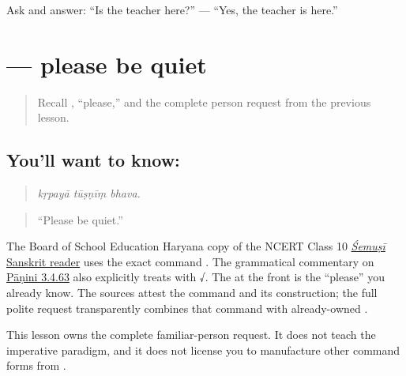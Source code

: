 \begin{tcolorbox}[breakable,colback=teal!4,colframe=teal!35!black,title={Before you move on}]
Ask and answer: “Is the teacher here?” — “Yes, the teacher is here.”
\end{tcolorbox}
\section[\texorpdfstring{\sk{कृपया} \sk{तूष्णीं} \sk{भव} (kṛpayā tūṣṇīṃ bhava)}{कृपया तूष्णीं भव (kṛpayā tūṣṇīṃ bhava)}]{   — please be quiet}

\label{lesson:SA-C271-request-quiet}



\begin{quote}
Recall \textbf{}, “please,” and the complete person request from the previous lesson.
\end{quote}

\subsection*{You'll want to know:   }
\begin{quote}
\textbf{  }
\end{quote}

\begin{quote}
\emph{kṛpayā tūṣṇīṃ bhava.}
\end{quote}

\begin{quote}
“Please be quiet.”
\end{quote}

The Board of School Education Haryana copy of the NCERT Class 10 \href{https://bseh.org.in/uploads/ebooks/20\_Class\_10th\_Shemushi\_Sansktit\_120pp.pdf}{\emph{Śemuṣī} Sanskrit reader} uses the exact command \textbf{ }. The grammatical commentary on \href{https://sanskritdocuments.org/learning\_tools/ashtadhyayi/vyakhya/3/3.4.63.htm}{Pāṇini 3.4.63} also explicitly treats \textbf{} with √. The \textbf{} at the front is the “please” you already know. The sources attest the command \textbf{ } and its construction; the full polite request transparently combines that command with already-owned \textbf{}.

\begin{grammarlens}[title={Grammar Lens: one complete request}]
This lesson owns the complete familiar-person request. It does not teach the imperative paradigm, and it does not license you to manufacture other command forms from \textbf{}.
\end{grammarlens}

